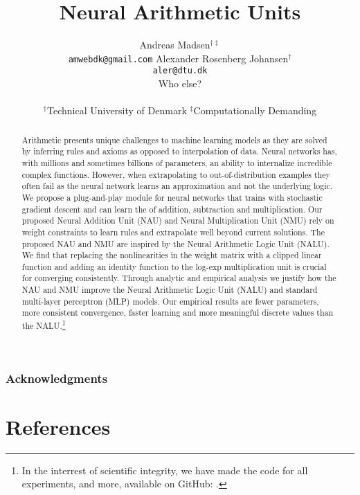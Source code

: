 \documentclass{article}
\title{Neural Arithmetic Units}
\author{%
  Andreas Madsen$^{\dag\ddag}$ \\
  \texttt{amwebdk@gmail.com}
  \AND
  Alexander Rosenberg Johansen$^{\dag}$ \\
  \texttt{aler@dtu.dk} \\
  \AND
  Who else? \\
  \\
$^\dag$Technical University of Denmark \quad
$^\ddag$Computationally Demanding
}
\begin{document}
\StopCensoring %

\maketitle

\begin{abstract}
Arithmetic presents unique challenges to machine learning models as they are solved by inferring rules and axioms as opposed to interpolation of data.
Neural networks has, with millions and sometimes billions of parameters, an ability to internalize incredible complex functions.
However, when extrapolating to out-of-distribution examples they often fail as the neural network learns an approximation and not the underlying logic.
We propose a plug-and-play module for neural networks that trains with stochastic gradient descent and can learn the of addition, subtraction and multiplication.
Our proposed Neural Addition Unit (NAU) and Neural Multiplication Unit (NMU) rely on weight constraints to learn rules and extrapolate well beyond current solutions.
The proposed NAU and NMU are inspired by the Neural Arithmetic Logic Unit (NALU).
We find that replacing the nonlinearities in the weight matrix with a clipped linear function and adding an identity function to the log-exp multiplication unit is crucial for converging consistently.
Through analytic and empirical analysis we justify how the NAU and NMU improve the Neural Arithmetic Logic Unit (NALU) and standard multi-layer perceptron (MLP) models.
Our empirical results are fewer parameters, more consistent convergence, faster learning and more meaningful discrete values than the NALU.\footnote{In the interrest of scientific integrity, we have made the code for all experiments, and more, available on GitHub: . }
\end{abstract}






\subsubsection*{Acknowledgments}


\section*{References}


\end{document}
